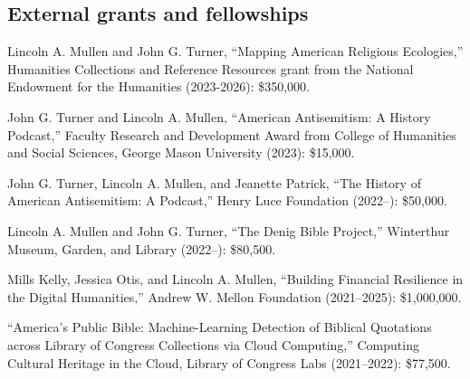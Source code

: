 \documentclass[11pt]{article}
\begin{document}


% 

\subsection{External grants and fellowships}\label{Grants and fellowships}

Lincoln A. Mullen and John G. Turner, ``Mapping American Religious Ecologies,'' 
Humanities Collections and Reference Resources grant from the National Endowment 
for the Humanities (2023-2026): \$350,000.

John G. Turner and Lincoln A. Mullen, ``American Antisemitism: A History 
Podcast,'' Faculty Research and Development Award from College of Humanities and 
Social Sciences, George Mason University (2023): \$15,000.

John G. Turner, Lincoln A. Mullen, and Jeanette Patrick, ``The History of American Antisemitism: A Podcast,'' Henry Luce Foundation (2022--): \$50,000.

Lincoln A. Mullen and John G. Turner, ``The Denig Bible Project,'' Winterthur Museum, Garden, and Library (2022--): \$80,500.

Mills Kelly, Jessica Otis, and Lincoln A. Mullen, ``Building Financial Resilience in the Digital Humanities,'' Andrew W. Mellon Foundation (2021--2025): \$1,000,000.

``America's Public Bible: Machine-Learning Detection of Biblical Quotations across Library of Congress Collections via Cloud Computing,'' Computing Cultural Heritage in the Cloud, Library of Congress Labs (2021--2022): \$77,500.
\end{document}
